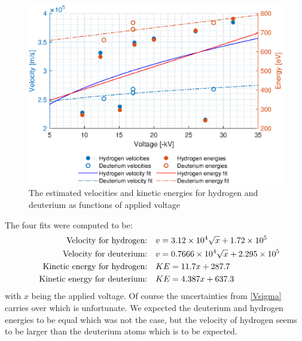 \begin{figure}
    \centering
    \includegraphics[width=.7\textwidth]{MatlabFigures/Asign3/KineticVelo.eps}
    \caption{The estimated velocities and kinetic energies for hydrogen and deuterium as functions of applied voltage}
    \label{MF}
\end{figure}
The four fits were computed to be:
\begin{align}
    \qq{Velocity for hydrogen:}& v = 3.12\times10^4 \sqrt{x}+1.72\times10^5 \\
    \qq{Velocity for deuterium:}& v = 0.7666\times10^4\sqrt{x}+2.295\times10^5\\
    \qq{Kinetic energy for hydrogen:}& KE = 11.7x+287.7\\
    \qq{Kinetic energy for deuterium:}& KE = 4.387x+637.3
\end{align}
with $x$ being the applied voltage. Of course the uncertainties from \cref{Vsigma} carries over which is unfortunate. We expected the deuterium and hydrogen energies to be equal which was not the case, but the velocity of hydrogen seems to be larger than the deuterium atoms which is to be expected.
